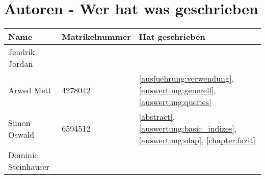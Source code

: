 \chapter{Autoren - Wer hat was geschrieben}
\begin{table}[H]
	\centering
	\begin{tabularx}{\textwidth}{llX}
		\toprule
		Name                &	Matrikelnummer  & Hat geschrieben \\
		\toprule
		Jendrik Jordan      &                   & \\
		Arwed Mett          &   4278042         & \autoref{ausfuehrung:verwendung}, \autoref{auswertung:generell}, \autoref{auswertung:queries} \\
		Simon Oswald        &   6594512         & \autoref{abstract}, \autoref{auswertung:basic_indizes}, \autoref{auswertung:olap}, \autoref{chapter:fazit} \\
		Dominic Steinhauser &                   & \\
		\bottomrule
	\end{tabularx}
	\label{tab:autoren}
\end{table}
